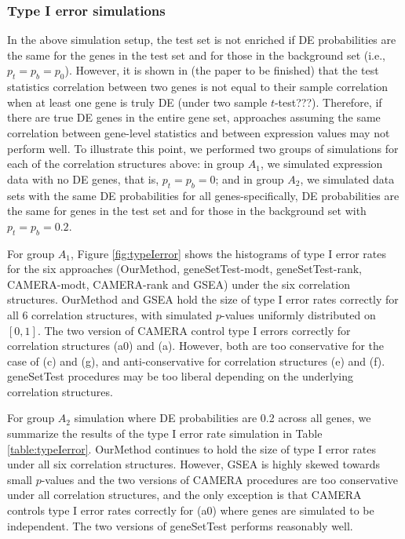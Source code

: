 \documentclass[11pt, a4paper]{article}
\begin{document}
		
		\subsubsection*{Type I error simulations}
		  
		   In the above simulation setup, the test set is not enriched if DE probabilities are the same for the genes in the test set and for those in the background set (i.e., $p_t = p_b = p_0$). However, it is shown in (the paper to be finished) that the test statistics correlation between two genes is not equal to their sample correlation when at least one gene is truly DE (under two sample $t$-test???). Therefore, if there are true DE genes in the entire gene set, approaches assuming the same correlation between gene-level statistics and between expression values may not perform well. To illustrate this point, we performed two groups of simulations for each of the correlation structures above: in group $A_1$, we simulated expression data with no DE genes, that is, $p_t = p_b = 0$; and in group $A_2$, we simulated data sets with the same DE probabilities for all genes-specifically, DE probabilities are the same for genes in the test set and for those in the background set with $p_t= p_b = 0.2$. 
		 
		  For group $A_1$, Figure \ref{fig:typeIerror} shows the histograms of type I error rates for the six approaches (OurMethod, geneSetTest-modt, geneSetTest-rank, CAMERA-modt, CAMERA-rank and GSEA) under the six correlation structures. OurMethod and GSEA hold the size of type I error rates correctly for all 6 correlation structures, with simulated $p$-values uniformly distributed on $[0, 1]$. The two version of CAMERA control type I errors correctly for correlation structures (a0) and (a). However, both are too conservative for the case of (c) and (g), and anti-conservative for correlation structures (e) and (f). geneSetTest procedures may be too liberal depending on the underlying correlation structures. 
		  
		 For group $A_2$ simulation where DE probabilities are 0.2 across all genes, we summarize the results of the type I error rate simulation in Table \ref{table:typeIerror}. OurMethod continues to hold the size of type I error rates under all six correlation structures. However, GSEA is highly skewed towards small $p$-values and the two versions of CAMERA procedures are too conservative under all correlation structures, and the only exception is that CAMERA controls type I error rates correctly for (a0) where genes are simulated to be independent. The two versions of geneSetTest performs reasonably well.
		 
\end{document}
